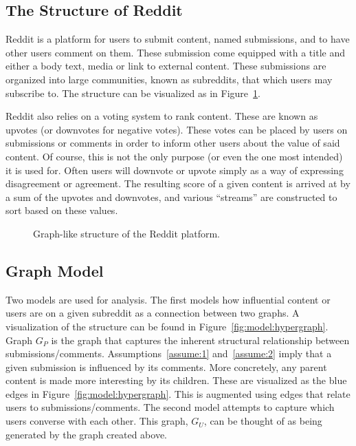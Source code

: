 \documentclass[letterpaper, 10 pt, conference]{ieeeconf}
\theoremstyle{definition}
\begin{document}
\subsection{The Structure of Reddit}
Reddit is a platform for users to submit content, named submissions, and to have other users comment on them. These submission come equipped with a title and either a body text, media or link to external content. These submissions are organized into large communities, known as subreddits, that which users may subscribe to. The structure can be visualized as in Figure~\ref{fig:model:reddit}.

Reddit also relies on a voting system to rank content. These are known as upvotes (or downvotes for negative votes). These votes can be placed by users on submissions or comments in order to inform other users about the value of said content. Of course, this is not the only purpose (or even the one most intended) it is used for. Often users will downvote or upvote simply as a way of expressing disagreement or agreement. The resulting score of a given content is arrived at by a sum of the upvotes and downvotes, and various ``streams'' are constructed to sort based on these values.

\begin{figure}
  \centering
  \caption{Graph-like structure of the Reddit platform.}
  \label{fig:model:reddit}
\end{figure}

\subsection{Graph Model}
Two models are used for analysis. The first models how influential content or users are on a given subreddit as a connection between two graphs. A visualization of the structure can be found in Figure~\ref{fig:model:hypergraph}. Graph \(G_P\) is the graph that captures the inherent structural relationship between submissions/comments. Assumptions~\ref{assume:1} and~\ref{assume:2} imply that a given submission is influenced by its comments. More concretely, any parent content is made more interesting by its children. These are visualized as the blue edges in Figure~\ref{fig:model:hypergraph}. This is augmented using edges that relate users to submissions/comments. The second model attempts to capture which users converse with each other. This graph, \(G_U\), can be thought of as being generated by the graph created above.
\end{document}
